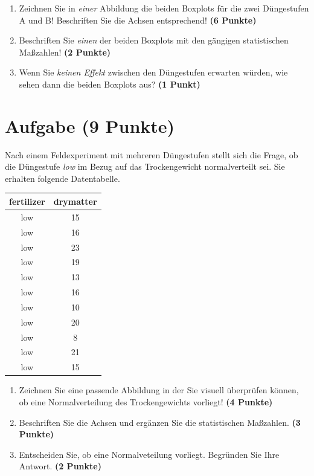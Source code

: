 \documentclass[a4paper, 10pt]{scrartcl}\usepackage[]{graphicx}\usepackage[]{xcolor}
\begin{document}
\begin{enumerate}
\item Zeichnen Sie in \textit{einer} Abbildung die beiden Boxplots f{\"u}r die
  zwei D{\"u}ngestufen A und B! Beschriften Sie die Achsen entsprechend!
  \textbf{(6 Punkte)}
\item Beschriften Sie \textit{einen} der beiden Boxplots mit den g{\"a}ngigen
  statistischen Ma{\ss}zahlen! \textbf{(2 Punkte)}
\item Wenn Sie \textit{keinen Effekt} zwischen den D{\"u}ngestufen erwarten
  w{\"u}rden, wie sehen dann die beiden Boxplots aus? \textbf{(1 Punkt)}
\end{enumerate} 
\clearpage

\section{Aufgabe \hfill (9 Punkte)}

Nach einem Feldexperiment mit mehreren D{\"u}ngestufen stellt sich die Frage,
ob die D{\"u}ngestufe \textit{low} im Bezug auf das Trockengewicht
normalverteilt sei. Sie erhalten folgende Datentabelle.

\begin{table}[!h]
\centering
\begin{tabular}{cc}
\toprule
fertilizer & drymatter\\
\midrule
low & 15\\
low & 16\\
low & 23\\
low & 19\\
low & 13\\
\addlinespace
low & 16\\
low & 10\\
low & 20\\
low & 8\\
low & 21\\
\addlinespace
low & 15\\
\bottomrule
\end{tabular}
\end{table}



\begin{enumerate}
\item Zeichnen Sie eine passende Abbildung in der Sie visuell {\"u}berpr{\"u}fen
  k{\"o}nnen, ob eine Normalverteilung des Trockengewichts vorliegt! \textbf{(4
    Punkte)}
\item Beschriften Sie die Achsen und erg{\"a}nzen Sie die statistischen
  Ma{\ss}zahlen. \textbf{(3 Punkte)}
\item Entscheiden Sie, ob eine Normalveteilung vorliegt. Begr{\"u}nden Sie Ihre
  Antwort. \textbf{(2 Punkte)}
\end{enumerate} 
\clearpage
\end{document}
